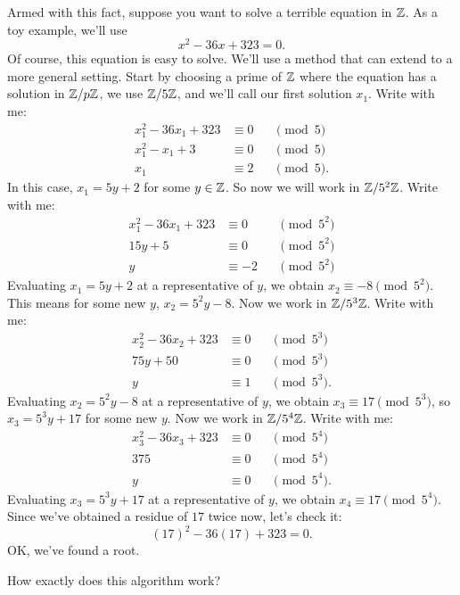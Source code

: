 \documentclass{ximera}
\begin{document}
Armed with this fact, suppose you want to solve a terrible equation in
$\mathbb Z$. As a toy example, we'll use
\[
x^2-36 x+323 = 0.
\]
Of course, this equation is easy to solve. We'll use a method that can
extend to a more general setting. Start by choosing a prime of $\mathbb Z$
where the equation has a solution in $\mathbb Z/p \mathbb Z$, we use $\mathbb Z/5\mathbb Z$, and
we'll call our first solution $x_1$. Write with me:
\begin{align*}
  x_1^2- 36x_1 + 323 &\equiv 0 &&\pmod{5}\\
  x_1^2 - x_1 + 3 &\equiv 0 &&\pmod{5}\\
  x_1 &\equiv 2&&\pmod{5}.
\end{align*}
In this case, $x_1 = 5y + 2$ for some $y\in \mathbb Z$. So now we will work
in $\mathbb Z/5^2\mathbb Z$. Write with me:
\begin{align*}
  x_1^2- 36x_1 + 323 &\equiv 0&&\pmod{5^2}\\
  15y+5 &\equiv 0 &&\pmod{5^2}\\
  y &\equiv -2 &&\pmod{5^2}
\end{align*}
Evaluating $x_1 = 5y+2$ at a representative of $y$, we obtain $x_2
\equiv -8 \pmod{5^2}$. This means for some new $y$, $x_2 = 5^2 y
-8$. Now we work in $\mathbb Z/5^3\mathbb Z$. Write with me:
\begin{align*}
  x_2^2- 36x_2 + 323 &\equiv 0&&\pmod{5^3}\\
  75y+50 &\equiv 0 &&\pmod{5^3}\\
  y &\equiv 1 &&\pmod{5^3}.
\end{align*}
Evaluating $x_2 = 5^2 y-8$ at a representative of $y$, we obtain $x_3
\equiv 17\pmod{5^3}$, so $x_3 = 5^3y+17$ for some new $y$. Now we work
in $\mathbb Z/5^4\mathbb Z$. Write with me:
\begin{align*}
  x_3^2- 36x_3 + 323 &\equiv 0 &&\pmod{5^4}\\
  375 &\equiv 0 &&\pmod{5^4}\\
  y &\equiv 0 &&\pmod{5^4}.
\end{align*}
Evaluating $x_3 = 5^3 y+17$ at a representative of $y$, we obtain $x_4
\equiv 17 \pmod{5^4}$.  Since we've obtained a residue of $17$ twice
now, let's check it:  
\[
(17)^2-36 (17)+323 = 0.
\]
OK, we've found a root.

\begin{question}
  How exactly does this algorithm work?
\end{question}
\end{document}
